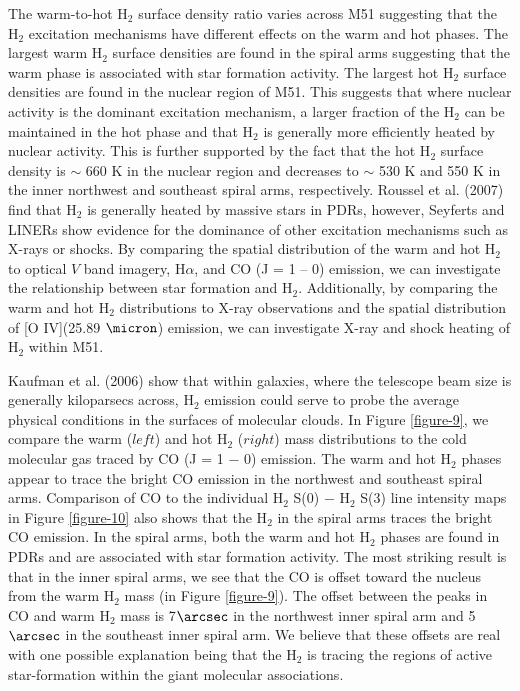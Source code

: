 \documentclass[12pt,preprint]{aastex}
\begin{document}
The warm-to-hot H$_2$ surface density ratio varies across 
M51 suggesting that the H$_2$ excitation mechanisms 
have different effects on the warm and hot phases. 
The largest warm H$_2$ surface densities are found in 
the spiral arms suggesting that the warm phase is 
associated with star formation activity.  The largest 
hot H$_2$ surface densities are found in the nuclear 
region of M51.  This suggests that where nuclear 
activity is the dominant excitation mechanism, a 
larger fraction of the H$_2$ can be maintained in 
the hot phase and that H$_2$ is generally more 
efficiently heated by nuclear activity.  This is further supported 
by the fact that the hot H$_2$ surface density is $\sim$ 660 K 
in the nuclear region and decreases to $\sim$ 530 K and 
550 K in the inner northwest and southeast spiral 
arms, respectively.  Roussel et al. (2007) 
find that H$_2$ is generally heated by massive stars in 
PDRs, however, Seyferts and LINERs show evidence for 
the dominance of other excitation mechanisms such as 
X-rays or shocks.  By comparing the spatial distribution 
of the warm and hot H$_2$ to optical $V$ band imagery, H$\alpha$, and CO 
(J = 1 -- 0) emission, we can investigate the relationship 
between star formation and H$_2$.  Additionally, by 
comparing the warm and hot H$_2$ distributions to X-ray 
observations and the spatial distribution of [O IV](25.89 $\micron$) 
emission, we can investigate X-ray and shock heating 
of H$_2$ within M51.

Kaufman et al. (2006) show that within galaxies, where the
telescope beam size is generally kiloparsecs across, H$_2$
emission could serve to probe the average physical 
conditions in the surfaces of molecular clouds.  In Figure 
\ref{figure-9}, we compare the warm ($left$) and hot
H$_2$ ($right$) mass distributions to the cold molecular 
gas traced by CO (J = 1 $-$ 0) emission.  The warm and hot 
H$_2$ phases appear to trace the bright CO emission
in the northwest and southeast spiral arms. Comparison 
of CO to the individual H$_2$  S(0) $-$ H$_2$ S(3) line intensity 
maps in Figure \ref{figure-10} also shows that the H$_2$ in 
the spiral arms traces the bright CO emission.  
In the spiral arms, both the warm and hot H$_2$ 
phases are found in PDRs and are associated 
with star formation activity.  The most 
striking result is that in the inner spiral arms, we see that the
CO is offset toward the nucleus from the 
warm H$_2$ mass (in Figure \ref{figure-9}).
The offset between the peaks in CO and warm H$_2$ mass is
7$\arcsec$ in the northwest inner spiral arm and 5$\arcsec$ in the
southeast inner spiral arm.  We believe that these offsets are real with
one possible explanation being that the H$_2$ is tracing the
regions of active star-formation within the giant molecular
associations.  
\end{document}
